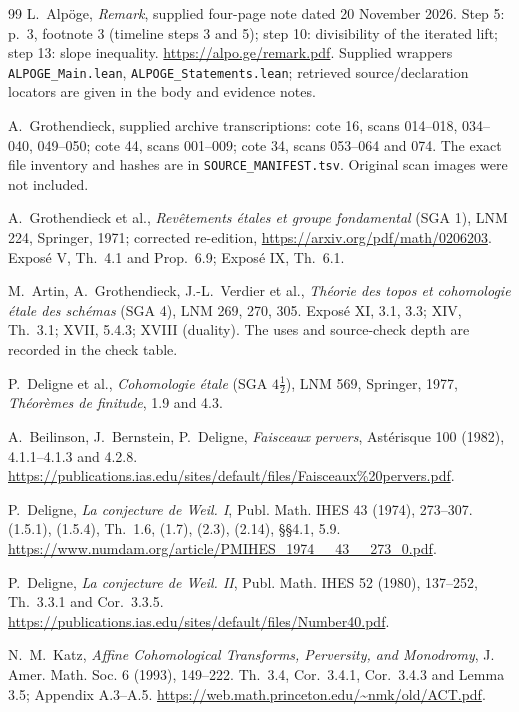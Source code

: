 \begin{thebibliography}{99}
L.~Alp\"oge, \emph{Remark}, supplied four-page note dated 20 November 2026.
Step 5: p.~3, footnote 3 (timeline steps 3 and 5); step 10: divisibility
of the iterated lift; step 13: slope inequality.
\url{https://alpo.ge/remark.pdf}. Supplied wrappers
\texttt{ALPOGE\_Main.lean}, \texttt{ALPOGE\_Statements.lean}; retrieved
source/declaration locators are given in the body and evidence notes.

A.~Grothendieck, supplied archive transcriptions: cote 16, scans 014--018,
034--040, 049--050; cote 44, scans 001--009; cote 34, scans 053--064 and
074. The exact file inventory and hashes are in \texttt{SOURCE\_MANIFEST.tsv}.
Original scan images were not included.

A.~Grothendieck et al., \emph{Rev\^etements \'etales et groupe fondamental}
(SGA 1), LNM 224, Springer, 1971; corrected re-edition,
\url{https://arxiv.org/pdf/math/0206203}.
Expos\'e V, Th.~4.1 and Prop.~6.9; Expos\'e IX, Th.~6.1.

M.~Artin, A.~Grothendieck, J.-L.~Verdier et al., \emph{Th\'eorie des topos
et cohomologie \'etale des sch\'emas} (SGA 4), LNM 269, 270, 305.
Expos\'e XI, 3.1, 3.3; XIV, Th.~3.1; XVII, 5.4.3; XVIII (duality).
The uses and source-check depth are recorded in the check table.

P.~Deligne et al., \emph{Cohomologie \'etale} (SGA $4\frac12$), LNM 569,
Springer, 1977, \emph{Th\'eor\`emes de finitude}, 1.9 and 4.3.

A.~Beilinson, J.~Bernstein, P.~Deligne, \emph{Faisceaux pervers},
Ast\'erisque 100 (1982), 4.1.1--4.1.3 and 4.2.8.
\url{https://publications.ias.edu/sites/default/files/Faisceaux%20pervers.pdf}.

P.~Deligne, \emph{La conjecture de Weil. I}, Publ. Math. IHES 43 (1974),
273--307. (1.5.1), (1.5.4), Th.~1.6, (1.7), (2.3), (2.14),
\S\S4.1, 5.9.
\url{https://www.numdam.org/article/PMIHES_1974__43__273_0.pdf}.

P.~Deligne, \emph{La conjecture de Weil. II}, Publ. Math. IHES 52 (1980),
137--252, Th.~3.3.1 and Cor.~3.3.5.
\url{https://publications.ias.edu/sites/default/files/Number40.pdf}.

N.~M.~Katz, \emph{Affine Cohomological Transforms, Perversity, and
Monodromy}, J. Amer. Math. Soc. 6 (1993), 149--222.
Th.~3.4, Cor.~3.4.1, Cor.~3.4.3 and Lemma 3.5; Appendix A.3--A.5.
\url{https://web.math.princeton.edu/~nmk/old/ACT.pdf}.


\end{thebibliography}
